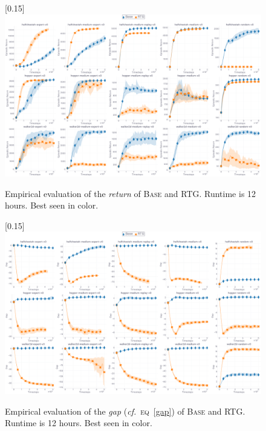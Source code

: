 \begin{figure}
  \center\scalebox{0.15}[0.15]{\includegraphics{Plots/base_vs_rtg/plots_main_eval_env_ret_plot.pdf}}
  \caption{Empirical evaluation of the \emph{return} of \textsc{Base} and RTG.
  Runtime is 12 hours. Best seen in color.}
  \label{basertg:barplot}
\end{figure}
\begin{figure}
  \center\scalebox{0.15}[0.15]{\includegraphics{Plots/base_vs_rtg/plots_gap_plot.pdf}}
  \caption{Empirical evaluation of the \emph{gap}
  (\textit{cf.}~\textsc{eq}~\ref{gap})
  of \textsc{Base} and RTG.
  Runtime is 12 hours. Best seen in color.}
  \label{basertggap:barplot}
\end{figure}

